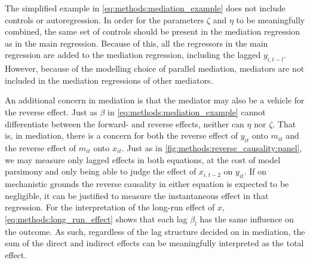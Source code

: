 \begin{figure}[htbp]
\begin{subfigure}[t]{0.32\textwidth}
        \label{fig:methods:mediation_forms:simultaneous}
    \end{subfigure}
\end{figure}

The simplified example in \cref{eq:methods:mediation_example} does not include controls or autoregression. In order for the parameters $\zeta$ and $\eta$
to be meaningfully combined, the same set of controls should be present in the mediation regression as in the main
regression. Because of this, all the regressors in the main regression are added to the mediation regression, including
the lagged $y_{i,t-l}$. However, because of the modelling choice of parallel mediation, mediators are not included
in the mediation regressions of other mediators.

An additional concern in mediation is that the mediator may also be a vehicle for the reverse effect.
Just as $\beta$ in \cref{eq:methods:mediation_example} cannot differentiate between the forward- and reverse effects,
neither can $\eta$ nor $\zeta$. That is, in mediation, there is a concern for both the reverse effect of $y_{it}$ onto
$m_{it}$ and the reverse effect of $m_{it}$ onto $x_{it}$. Just as in \cref{fig:methods:reverse_causality:panel},
we may measure only lagged effects in both equations, at the cost of model parsimony and only being able to judge the
effect of $x_{i,t-2}$ on $y_{it}$.
If on mechanistic grounds the reverse causality in either equation is expected to be negligible, it can be justified
to measure the instantaneous effect in that regression.
For the interpretation of the long-run effect of $x$, \cref{eq:methods:long_run_effect} shows that each lag $\beta_l$
has the same influence on the outcome. As such, regardless of the lag structure decided on in mediation, the sum of the
direct and indirect effects can be meaningfully interpreted as the total effect.

